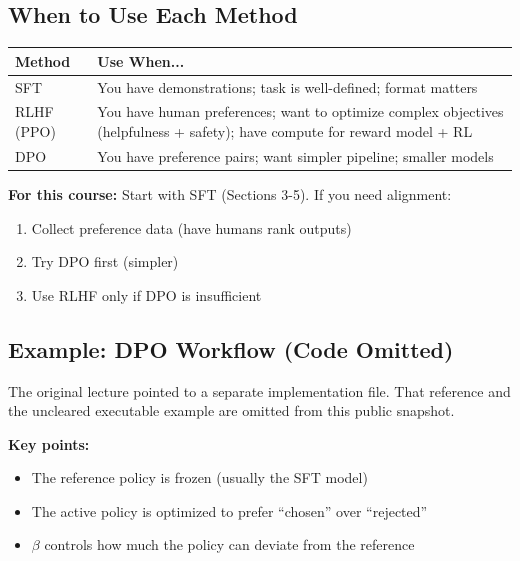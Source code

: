 \documentclass{article}
\begin{document}
\subsection{When to Use Each Method}

\begin{center}
\begin{tabular}{|l|p{10cm}|}
\hline
\textbf{Method} & \textbf{Use When...} \\
\hline
SFT & You have demonstrations; task is well-defined; format matters \\
\hline
RLHF (PPO) & You have human preferences; want to optimize complex objectives (helpfulness + safety); have compute for reward model + RL \\
\hline
DPO & You have preference pairs; want simpler pipeline; smaller models \\
\hline
\end{tabular}
\end{center}

\begin{tcolorbox}[colback=green!5!white, colframe=green!50!black, title=Practical Recommendation]
\textbf{For this course:} Start with SFT (Sections 3-5). If you need alignment:
\begin{enumerate}
\item Collect preference data (have humans rank outputs)
\item Try DPO first (simpler)
\item Use RLHF only if DPO is insufficient
\end{enumerate}

\end{tcolorbox}

\subsection{Example: DPO Workflow (Code Omitted)}

The original lecture pointed to a separate implementation file. That reference and the uncleared executable example are omitted from this public snapshot.


\textbf{Key points:}
\begin{itemize}
\item The reference policy is frozen (usually the SFT model)
\item The active policy is optimized to prefer ``chosen'' over ``rejected''
\item $\beta$ controls how much the policy can deviate from the reference
\end{itemize}
\end{document}
